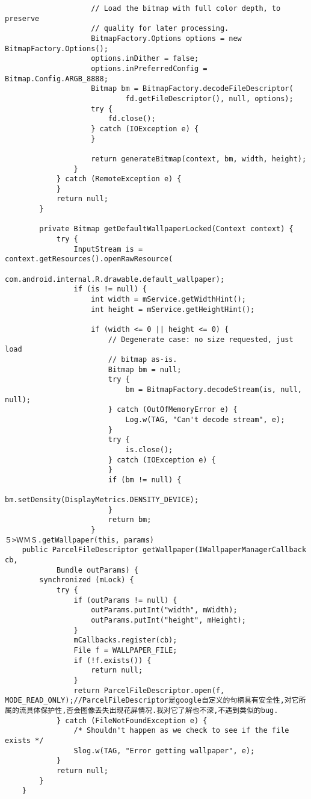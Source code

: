 \documentclass[a4paper,11pt,twoside,openany]{article}%
\begin{document}
\begin{CJK}{UTF8}{song}
\begin{verbatim}
                    // Load the bitmap with full color depth, to preserve 
                    // quality for later processing. 
                    BitmapFactory.Options options = new BitmapFactory.Options(); 
                    options.inDither = false; 
                    options.inPreferredConfig = Bitmap.Config.ARGB_8888; 
                    Bitmap bm = BitmapFactory.decodeFileDescriptor( 
                            fd.getFileDescriptor(), null, options); 
                    try { 
                        fd.close(); 
                    } catch (IOException e) { 
                    } 
                    
                    return generateBitmap(context, bm, width, height); 
                } 
            } catch (RemoteException e) { 
            } 
            return null; 
        } 
        
        private Bitmap getDefaultWallpaperLocked(Context context) { 
            try { 
                InputStream is = context.getResources().openRawResource( 
                        com.android.internal.R.drawable.default_wallpaper); 
                if (is != null) { 
                    int width = mService.getWidthHint(); 
                    int height = mService.getHeightHint(); 
                    
                    if (width <= 0 || height <= 0) { 
                        // Degenerate case: no size requested, just load 
                        // bitmap as-is. 
                        Bitmap bm = null; 
                        try { 
                            bm = BitmapFactory.decodeStream(is, null, null); 
                        } catch (OutOfMemoryError e) { 
                            Log.w(TAG, "Can't decode stream", e); 
                        } 
                        try { 
                            is.close(); 
                        } catch (IOException e) { 
                        } 
                        if (bm != null) { 
                            bm.setDensity(DisplayMetrics.DENSITY_DEVICE); 
                        } 
                        return bm; 
                    } 
５>ＷＭＳ.getWallpaper(this, params) 
    public ParcelFileDescriptor getWallpaper(IWallpaperManagerCallback cb, 
            Bundle outParams) { 
        synchronized (mLock) { 
            try { 
                if (outParams != null) { 
                    outParams.putInt("width", mWidth); 
                    outParams.putInt("height", mHeight); 
                } 
                mCallbacks.register(cb); 
                File f = WALLPAPER_FILE; 
                if (!f.exists()) { 
                    return null; 
                } 
                return ParcelFileDescriptor.open(f, MODE_READ_ONLY);//ParcelFileDescriptor是google自定义的句柄具有安全性,对它所属的流具体保护性,否会图像丢失出现花屏情况.我对它了解也不深,不遇到类似的bug. 
            } catch (FileNotFoundException e) { 
                /* Shouldn't happen as we check to see if the file exists */ 
                Slog.w(TAG, "Error getting wallpaper", e); 
            } 
            return null; 
        } 
    } 


\end{verbatim}
\end{CJK}
\end{document}
